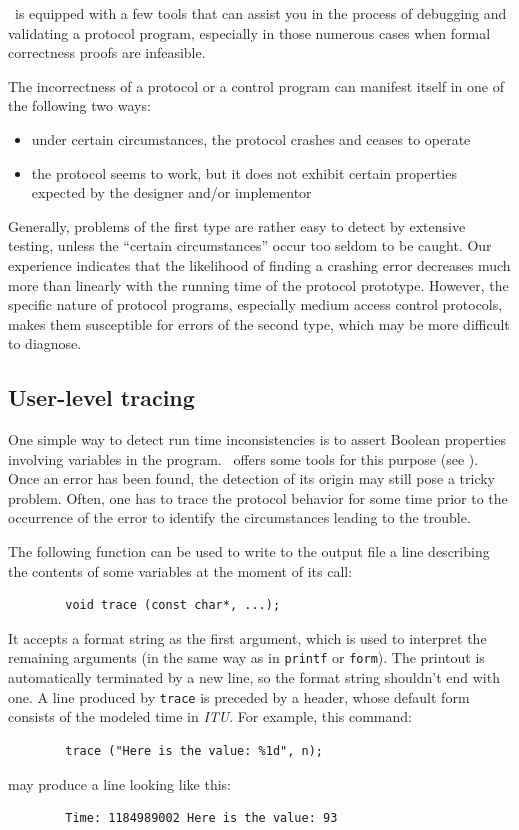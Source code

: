 \smurph\ is equipped with a few tools that can assist you in the
process of debugging and validating a protocol program, especially in those
numerous cases when formal correctness proofs are infeasible.

The incorrectness of a protocol or a control program
can manifest itself in one of the following two ways:
\begin{itemize}
\item
under certain circumstances, the protocol crashes and ceases to operate
\item
the protocol seems to work, but it does not exhibit certain properties
expected by the designer and/or implementor
\end{itemize}

Generally, problems of the first type are rather easy to detect by extensive
testing, unless the ``certain circumstances'' occur too seldom to be caught.
Our experience indicates that the likelihood of finding a crashing error
decreases much more than linearly with the running time of the protocol
prototype.
However, the specific nature of protocol programs, especially medium access
control protocols, makes them susceptible
for errors of the second type, which may be more difficult to diagnose.

\subsection{User-level tracing}
\label{rm_ob_pt}

One simple way to detect run time inconsistencies
is to assert Boolean properties
involving variables in the program.
\smurph\ offers some tools for this purpose (see ).
Once an error has been found, the detection of its origin may still pose
a tricky problem.
Often, one has to trace the protocol behavior for some time
prior to the occurrence of the error to identify the circumstances
leading to the trouble.

The following function can be used
to write to the output file a line describing the contents
of some variables at the moment of its call:
\begin{verbatim}
        void trace (const char*, ...);
\end{verbatim}
It accepts a format string as the first argument, which
is used to interpret the remaining arguments (in the same way
as in {\tt printf} or {\tt form}).
The printout is automatically terminated by a new line, so the format string
shouldn't end with one.
A line produced by {\tt trace}
is preceded by a header, whose default form consists of the modeled time
in {\em ITU\/}.
For example, this command:
\begin{verbatim}
        trace ("Here is the value: %1d", n);
\end{verbatim}
may produce a line looking like this:
\begin{verbatim}
        Time: 1184989002 Here is the value: 93
\end{verbatim}

